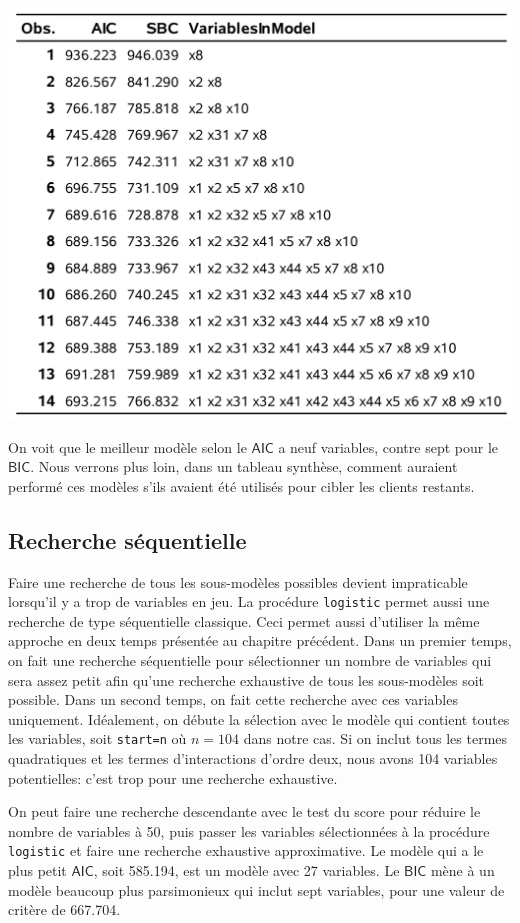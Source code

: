 \documentclass[
  11pt,
  letterpaper,
]{book}
\theoremstyle{definition}
\theoremstyle{definition}
\theoremstyle{definition}
\theoremstyle{definition}
\theoremstyle{remark}
\begin{document}
\begin{center}\includegraphics[width=0.8\linewidth]{figures/03-logistic-e21} \end{center}

On voit que le meilleur modèle selon le \(\mathsf{AIC}\) a neuf variables, contre sept pour le \(\mathsf{BIC}\). Nous verrons plus loin, dans un tableau synthèse, comment auraient performé ces modèles s'ils avaient été utilisés pour cibler les clients restants.

\hypertarget{recherche-suxe9quentielle-1}{%
\subsection{Recherche séquentielle}\label{recherche-suxe9quentielle-1}}

Faire une recherche de tous les sous-modèles possibles devient impraticable lorsqu'il y a trop de variables en jeu. La procédure \texttt{logistic} permet aussi une recherche de type séquentielle classique. Ceci permet aussi d'utiliser la même approche en deux temps présentée au chapitre précédent. Dans un premier temps, on fait une recherche séquentielle pour sélectionner un nombre de variables qui sera assez petit afin qu'une recherche exhaustive de tous les sous-modèles soit possible. Dans un second temps, on fait cette recherche avec ces variables uniquement. Idéalement, on débute la sélection avec le modèle qui contient toutes les variables, soit \texttt{start=n} où \(n=104\) dans notre cas.
Si on inclut tous les termes quadratiques et les termes d'interactions d'ordre deux, nous avons 104 variables potentielles: c'est trop pour une recherche exhaustive.

On peut faire une recherche descendante avec le test du score pour réduire le nombre de variables à 50, puis passer les variables sélectionnées à la procédure \texttt{logistic} et faire une recherche exhaustive approximative. Le modèle qui a le plus petit \(\mathsf{AIC}\), soit 585.194, est un modèle avec 27 variables. Le \(\mathsf{BIC}\) mène à un modèle beaucoup plus parsimonieux qui inclut sept variables, pour une valeur de critère de 667.704.
\end{document}
